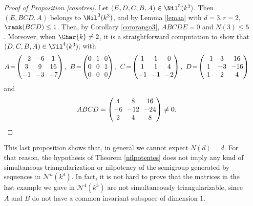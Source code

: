 \begin{proof}[Proof of Proposition \ref{casotres}]
Let $(E,D,C,B,A)\in \Nil^{5}(k^{3})$. Then $(E,BCD,A)$ belongs to $\Nil^{3}(k^{3})$, and by Lemma \ref{lemaa} with $d=3, r=2$, $\rank(BCD)\leq 1$. Then, by Corollary \ref{cororango3}, $ABCDE=0$ and $N(3)\leq 5$.
Moreover, when $\Char{k}\neq 2$, it is a straightforward computation to show that $(D,C,B,A)\in \Nil^{4}(k^{3})$, with
\begin{equation*}
\arraycolsep3.5pt
A\!=\!\begin{pmatrix}
-2 & -6 & 1\\
3 & 9 & 16\\
-1 & -3 & -7\\
\end{pmatrix},\ B\!=\!\begin{pmatrix}
0 & 1 & 0\\
0 & 0 & 1\\
0 & 0 & 0\\
\end{pmatrix},\ C\!=\!\begin{pmatrix}
1 & 1 & 0\\
1 & 1 & 4\\
-1 & -1 & -2\\
\end{pmatrix},\ D\!=\!\begin{pmatrix}
-1 & 3 & 16\\
1 & -3 & -16\\
1 & 2 & 4\\
\end{pmatrix}
\end{equation*}
and
\[\arraycolsep3.5pt
ABCD=\begin{pmatrix}
4 & 8 & 16\\
-6 & -12 & -24\\
2 & 4 & 8\\
\end{pmatrix}\neq 0.\qedhere
\]
\end{proof}

\begin{obs} This last proposition shows that, in general we cannot expect \hbox{$N(d)=d$}. For that reason, the hypothesis of Theorem \ref{nilpotentes} does not imply any kind of simultaneous triangularization or nilpotency of the semigroup generated by sequences in $\mathcal{N}^{n}(k^{d})$. In fact, it is not hard to prove that the matrices in the last example we gave in $\mathcal{N}^{4}(k^{3})$ are not simultaneously triangularizable, since $A$ and $B$ do not have a common invariant subspace of dimension $1$.
\end{obs}
